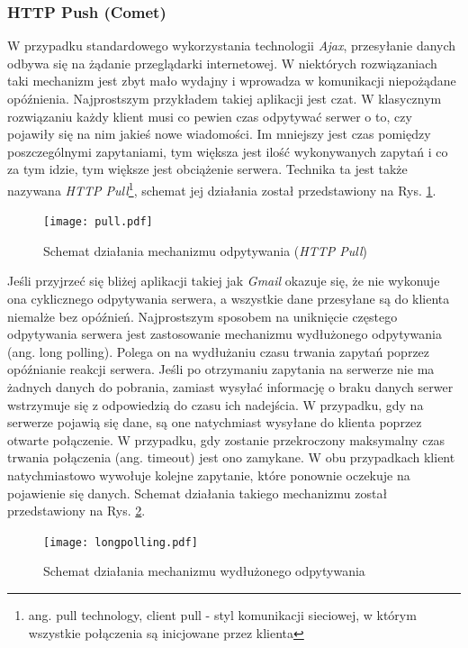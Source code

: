 \documentclass[a4paper,12pt]{article}
\providecommand{\imref}[1]{Rys. \ref{#1}} %
\begin{document}
\subsubsection{HTTP Push (Comet)}
W przypadku standardowego wykorzystania technologii \emph{Ajax},
przesyłanie danych odbywa się na żądanie przeglądarki internetowej. W
niektórych rozwiązaniach taki mechanizm jest zbyt mało wydajny i
wprowadza w komunikacji niepożądane opóźnienia. Najprostszym
przykładem takiej aplikacji jest czat. W klasycznym rozwiązaniu każdy
klient musi co pewien czas odpytywać serwer o to, czy pojawiły się na
nim jakieś nowe wiadomości. Im mniejszy jest czas pomiędzy
poszczególnymi zapytaniami, tym większa jest ilość wykonywanych
zapytań i co za tym idzie, tym większe jest obciążenie
serwera. Technika ta jest także nazywana \emph{HTTP
  Pull}\footnote{ang. pull technology, client pull - styl komunikacji
  sieciowej, w którym wszystkie połączenia są inicjowane przez
  klienta\cite{pull}}, schemat jej działania został przedstawiony na
\imref{pull}.

\begin{figure}[ht]
  \begin{center}
    \texttt{[image: pull.pdf]}
  \end{center}
  \caption{Schemat działania mechanizmu odpytywania (\emph{HTTP
      Pull})}
  \label{pull}
\end{figure}

Jeśli przyjrzeć się bliżej aplikacji takiej jak \emph{Gmail} okazuje
się, że nie wykonuje ona cyklicznego odpytywania serwera, a wszystkie
dane przesyłane są do klienta niemalże bez opóźnień. Najprostszym
sposobem na uniknięcie częstego odpytywania serwera jest zastosowanie
mechanizmu wydłużonego odpytywania (ang. long polling). Polega on na
wydłużaniu czasu trwania zapytań poprzez opóźnianie reakcji
serwera. Jeśli po otrzymaniu zapytania na serwerze nie ma żadnych
danych do pobrania, zamiast wysyłać informację o braku danych serwer
wstrzymuje się z odpowiedzią do czasu ich nadejścia. W przypadku, gdy
na serwerze pojawią się dane, są one natychmiast wysyłane do klienta
poprzez otwarte połączenie. W przypadku, gdy zostanie przekroczony
maksymalny czas trwania połączenia (ang. timeout) jest ono zamykane. W
obu przypadkach klient natychmiastowo wywołuje kolejne zapytanie,
które ponownie oczekuje na pojawienie się danych. Schemat działania
takiego mechanizmu został przedstawiony na \imref{longpolling}.

\begin{figure}[ht]
  \begin{center}
    \texttt{[image: longpolling.pdf]}
  \end{center}
  \caption{Schemat działania mechanizmu wydłużonego odpytywania}
  \label{longpolling}
\end{figure}
\end{document}
